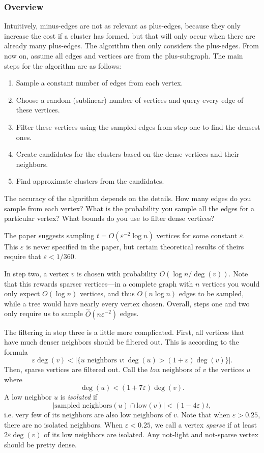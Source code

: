 \documentclass[
]{article}
\providecommand{\tightlist}{%
  \setlength{\itemsep}{0pt}\setlength{\parskip}{0pt}}
\begin{document}
\hypertarget{overview}{%
\subsubsection{Overview}\label{overview}}

Intuitively, minus-edges are not as relevant as plus-edges, because they only increase the cost if a cluster has formed, but that will only occur when there are already many plus-edges. The algorithm then only considers the plus-edges. From now on, assume all edges and vertices are from the plus-subgraph. The main steps for the algorithm are as follows:
\begin{enumerate}
\tightlist
\item
  Sample a constant number of edges from each vertex.
\item
  Choose a random (sublinear) number of vertices and query every edge of
  these vertices.
\item
  Filter these vertices using the sampled edges from step one to find
  the densest ones.
\item
  Create candidates for the clusters based on the dense vertices and
  their neighbors.
\item
  Find approximate clusters from the candidates.
\end{enumerate}

The accuracy of the algorithm depends on the details. How many edges do
you sample from each vertex? What is the probability you sample all the
edges for a particular vertex? What bounds do you use to filter dense
vertices?

The paper suggests sampling {\(t = O(\varepsilon^{- 2}\log n)\)}
vertices for some constant {\(\varepsilon\)}. This {\(\varepsilon\)} is
never specified in the paper, but certain theoretical results of theirs
require that {\(\varepsilon < 1/360\)}.

In step two, a vertex {\(v\)} is chosen with probability
{\(O(\log n/\deg(v))\)}. Note that this rewards sparser vertices---in a
complete graph with {\(n\)} vertices you would only expect
{\(O(\log n)\)} vertices, and thus {\(O(n\log n)\)} edges to be sampled,
while a tree would have nearly every vertex chosen. Overall, steps one
and two only require us to sample
{\(\overset{\sim}{O}(n\varepsilon^{- 2})\)} edges.

The filtering in step three is a little more complicated. First, all
vertices that have much denser neighbors should be filtered out. This is
according to the formula
{\[\varepsilon\deg(v) < |\{ u\text{~neighbors~}v:\deg(u) > (1 + \varepsilon)\deg(v)\}|.\]}Then,
sparse vertices are filtered out. Call the \emph{low} neighbors of
{\(v\)} the vertices {\(u\)} where
{\[\deg(u) < (1 + 7\varepsilon)\deg(v).\]}A low neighbor {\(u\)} is
\emph{isolated} if
{\[|\text{sampled\ neighbors}(u) \cap \text{low}(v)| < (1 - 4\varepsilon)t,\]}i.e.
very few of its neighbors are also low neighbors of {\(v\)}. Note that when $\varepsilon > 0.25$, there are no isolated neighbors. When $\varepsilon < 0.25$, we call a vertex \emph{sparse} if at least {\(2\varepsilon\deg(v)\)} of its low neighbors are isolated. Any not-light and not-sparse vertex should be pretty dense.
\end{document}

